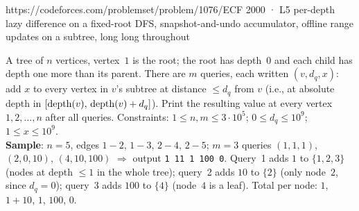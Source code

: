   {https://codeforces.com/problemset/problem/1076/E}{CF 2000 · L5}
  {per-depth lazy difference on a fixed-root DFS, snapshot-and-undo accumulator, offline range updates on a subtree, long long throughout}

\begin{problemstatement}
A tree of $n$ vertices, vertex~$1$ is the root; the root has depth~$0$
and each child has depth one more than its parent. There are $m$
queries, each written $(v, d_q, x)$: add $x$ to every vertex in $v$'s
subtree at distance $\le d_q$ from $v$ (i.e., at absolute depth in
$[\operatorname{depth}(v),\,\operatorname{depth}(v) + d_q]$). Print the resulting value at every
vertex $1,2,\dots,n$ after all queries. Constraints:
$1\le n,m\le 3\cdot 10^{5}$; $0\le d_q\le 10^{9}$;
$1\le x\le 10^{9}$.\\
\textbf{Sample}: $n=5$, edges $1\!-\!2$, $1\!-\!3$, $2\!-\!4$,
$2\!-\!5$; $m=3$ queries $(1,1,1)$, $(2,0,10)$, $(4,10,100)$ $\Rightarrow$
output \texttt{1 11 1 100 0}. Query~1 adds $1$ to $\{1,2,3\}$ (nodes at
depth $\le 1$ in the whole tree); query~2 adds $10$ to $\{2\}$ (only
node~$2$, since $d_q=0$); query~3 adds $100$ to $\{4\}$ (node~$4$ is a
leaf). Total per node: $1$, $1+10$, $1$, $100$, $0$.
\end{problemstatement}

